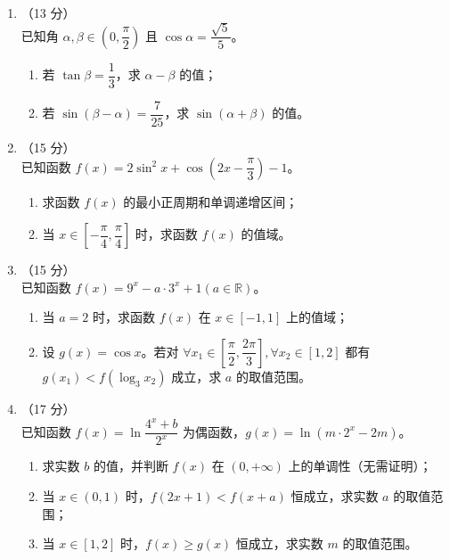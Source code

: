 \documentclass[10pt]{exam-zh}
\begin{document}
	\begin{enumerate}[leftmargin=*, label=\arabic*.]
		\item[15.] （13 分）\\
		已知角 \(\alpha, \beta \in \left(0, \dfrac{\pi}{2}\right)\) 且 \(\cos \alpha = \dfrac{\sqrt{5}}{5}\)。
		\begin{enumerate}[label=(\arabic*)]
			\item 若 \(\tan \beta = \dfrac{1}{3}\)，求 \(\alpha - \beta\) 的值；
			\item 若 \(\sin(\beta - \alpha) = \dfrac{7}{25}\)，求 \(\sin(\alpha + \beta)\) 的值。
		\end{enumerate}
		\newpage
		\item[16.] （15 分）\\
		已知函数 \(f(x) = 2\sin^2 x + \cos\left(2x - \dfrac{\pi}{3}\right) - 1\)。
		\begin{enumerate}[label=(\arabic*)]
			\item 求函数 \(f(x)\) 的最小正周期和单调递增区间；
			\item 当 \(x \in \left[-\dfrac{\pi}{4}, \dfrac{\pi}{4}\right]\) 时，求函数 \(f(x)\) 的值域。
		\end{enumerate}
			\vspace{8cm}
		\item[17.] （15 分）\\
		已知函数 \(f(x) = 9^x - a \cdot 3^x + 1 (a \in \mathbb{R})\)。
		\begin{enumerate}[label=(\arabic*)]
			\item 当 \(a = 2\) 时，求函数 \(f(x)\) 在 \(x \in [-1, 1]\) 上的值域；
			\item 设 \(g(x) = \cos x\)。若对 \(\forall x_1 \in \left[\dfrac{\pi}{2}, \dfrac{2\pi}{3}\right], \forall x_2 \in [1, 2]\) 都有 \(g(x_1) < f(\log_3 x_2)\) 成立，求 \(a\) 的取值范围。
		\end{enumerate}
		\newpage
		\item[18.] （17 分）\\
		已知函数 \( f(x) = \ln \dfrac{4^x + b}{2^x} \) 为偶函数，\( g(x) = \ln (m \cdot 2^x - 2m) \)。
		\begin{enumerate}[label=(\arabic*)]
			\item 求实数 \( b \) 的值，并判断 \( f(x) \) 在 \( (0, +\infty) \) 上的单调性（无需证明）；
			\item 当 \( x \in (0, 1) \) 时，\( f(2x+1) < f(x+a) \) 恒成立，求实数 \( a \) 的取值范围；
			\item 当 \( x \in [1, 2] \) 时，\( f(x) \geq g(x) \) 恒成立，求实数 \( m \) 的取值范围。

\end{enumerate}
\end{enumerate}
\end{document}
